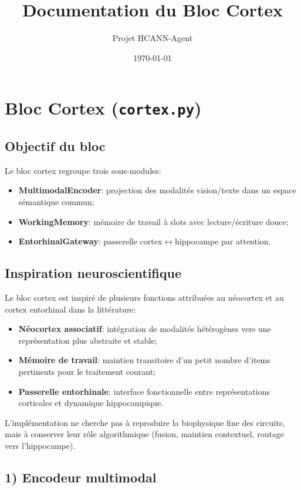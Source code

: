 \documentclass[12pt,a4paper]{article}
\title{Documentation du Bloc Cortex}
\author{Projet HCANN-Agent }
\date{\today}
\begin{document}
\maketitle

\section{Bloc Cortex (\texttt{cortex.py})}

\subsection{Objectif du bloc}
Le bloc cortex regroupe trois sous-modules:
\begin{itemize}
    \item \textbf{MultimodalEncoder}: projection des modalités vision/texte dans un espace sémantique commun;
    \item \textbf{WorkingMemory}: mémoire de travail à slots avec lecture/écriture douce;
    \item \textbf{EntorhinalGateway}: passerelle cortex$\leftrightarrow$hippocampe par attention.
\end{itemize}

\subsection{Inspiration neuroscientifique}
Le bloc cortex est inspiré de plusieurs fonctions attribuées au néocortex et au cortex entorhinal dans la littérature:
\begin{itemize}
    \item \textbf{Néocortex associatif}: intégration de modalités hétérogènes vers une représentation plus abstraite et stable;
    \item \textbf{Mémoire de travail}: maintien transitoire d'un petit nombre d'items pertinents pour le traitement courant;
    \item \textbf{Passerelle entorhinale}: interface fonctionnelle entre représentations corticales et dynamique hippocampique.
\end{itemize}
L'implémentation ne cherche pas à reproduire la biophysique fine des circuits, mais à conserver leur rôle algorithmique (fusion, maintien contextuel, routage vers l'hippocampe).

\subsection{1) Encodeur multimodal}
\end{document}
